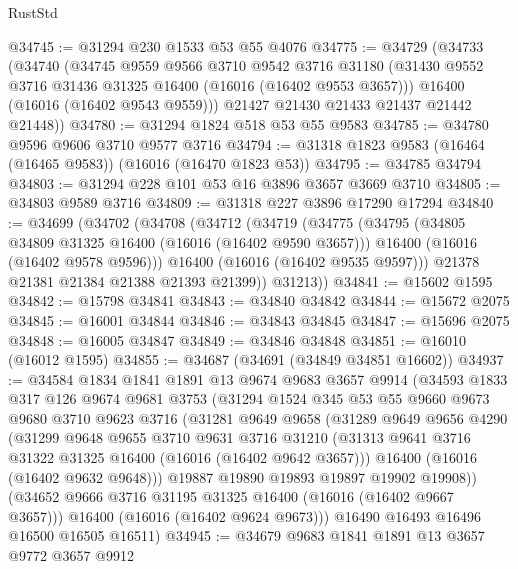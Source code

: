\begin{lexlean}{RustStd}
\begin{coremodule}
@34745 := @31294 @230 @1533 @53 @55 @4076
@34775 := @34729
    (@34733
      (@34740
        (@34745
          @9559
          @9566
          @3710
          @9542
          @3716
          @31180
          (@31430 @9552 @3716 @31436 @31325 @16400 (@16016 (@16402 @9553 @3657)))
          @16400
          (@16016 (@16402 @9543 @9559)))
        @21427
        @21430
        @21433
        @21437
        @21442
        @21448))
@34780 := @31294 @1824 @518 @53 @55 @9583
@34785 := @34780 @9596 @9606 @3710 @9577 @3716
@34794 := @31318 @1823 @9583 (@16464 (@16465 @9583)) (@16016 (@16470 @1823 @53))
@34795 := @34785 @34794
@34803 := @31294 @228 @101 @53 @16 @3896 @3657 @3669 @3710
@34805 := @34803 @9589 @3716
@34809 := @31318 @227 @3896 @17290 @17294
@34840 := @34699
    (@34702
      (@34708
        (@34712
          (@34719
            (@34775
              (@34795
                (@34805 @34809 @31325 @16400 (@16016 (@16402 @9590 @3657)))
                @16400
                (@16016 (@16402 @9578 @9596)))
              @16400
              (@16016 (@16402 @9535 @9597)))
            @21378
            @21381
            @21384
            @21388
            @21393
            @21399))
        @31213))
@34841 := @15602 @1595
@34842 := @15798 @34841
@34843 := @34840 @34842
@34844 := @15672 @2075
@34845 := @16001 @34844
@34846 := @34843 @34845
@34847 := @15696 @2075
@34848 := @16005 @34847
@34849 := @34846 @34848
@34851 := @16010 (@16012 @1595)
@34855 := @34687 (@34691 (@34849 @34851 @16602))
@34937 := @34584
    @1834
    @1841
    @1891
    @13
    @9674
    @9683
    @3657
    @9914
    (@34593
      @1833
      @317
      @126
      @9674
      @9681
      @3753
      (@31294
        @1524
        @345
        @53
        @55
        @9660
        @9673
        @9680
        @3710
        @9623
        @3716
        (@31281
          @9649
          @9658
          (@31289
            @9649
            @9656
            @4290
            (@31299
              @9648
              @9655
              @3710
              @9631
              @3716
              @31210
              (@31313 @9641 @3716 @31322 @31325 @16400 (@16016 (@16402 @9642 @3657)))
              @16400
              (@16016 (@16402 @9632 @9648)))
            @19887
            @19890
            @19893
            @19897
            @19902
            @19908))
        (@34652 @9666 @3716 @31195 @31325 @16400 (@16016 (@16402 @9667 @3657)))
        @16400
        (@16016 (@16402 @9624 @9673)))
      @16490
      @16493
      @16496
      @16500
      @16505
      @16511)
@34945 := @34679 @9683 @1841 @1891 @13 @3657 @9772 @3657 @9912

\end{coremodule}
\end{lexlean}
